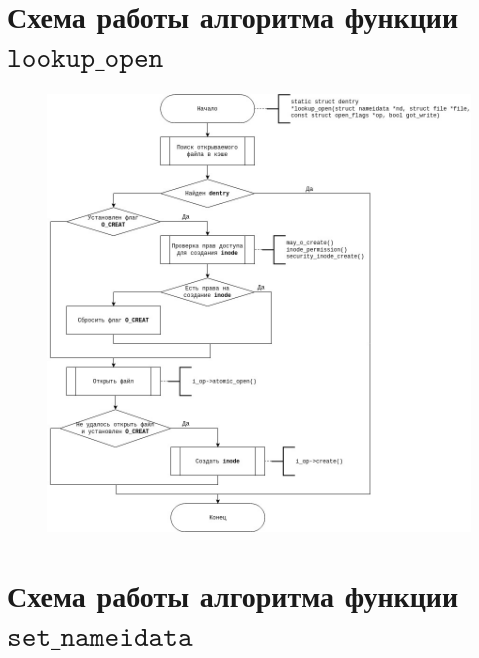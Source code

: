 \documentclass[12pt]{report}
\begin{document}
\section{Схема работы алгоритма функции $\texttt{lookup\_open}$}

\begin{figure}[H]
	\centering
	\includegraphics[scale=0.6]{img/lookup_open.jpg}
	\label{fig:lookup_open}
\end{figure}

\section{Схема работы алгоритма функции $\texttt{set\_nameidata}$}
\end{document}
